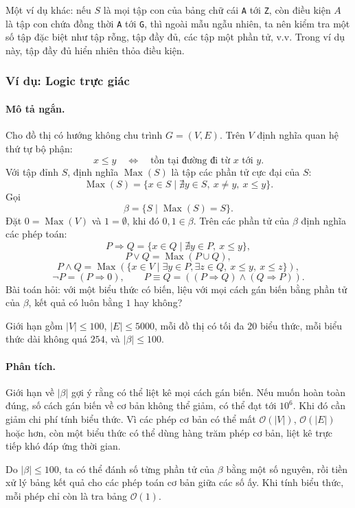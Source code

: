 \documentclass[11pt]{article}
\newcommand{\Oh}{\mathcal{O}}
\newcommand{\Max}{\operatorname{Max}}
\begin{document}
Một ví dụ khác: nếu $S$ là mọi tập con của bảng chữ cái \texttt{A} tới
\texttt{Z}, còn điều kiện $A$ là tập con chứa đồng thời \texttt{A} tới
\texttt{G}, thì ngoài mẫu ngẫu nhiên, ta nên kiểm tra một số tập đặc biệt như
tập rỗng, tập đầy đủ, các tập một phần tử, v.v. Trong ví dụ này, tập đầy đủ
hiển nhiên thỏa điều kiện.

\subsubsection{Ví dụ: Logic trực giác}

\paragraph{Mô tả ngắn.}
Cho đồ thị có hướng không chu trình $G=(V,E)$. Trên $V$ định nghĩa quan hệ thứ
tự bộ phận:
\[
  x\le y \quad\Longleftrightarrow\quad
  \text{tồn tại đường đi từ }x\text{ tới }y.
\]
Với tập đỉnh $S$, định nghĩa $\Max(S)$ là tập các phần tử cực đại của $S$:
\[
  \Max(S)=\{x\in S\mid \nexists y\in S,\ x\ne y,\ x\le y\}.
\]
Gọi
\[
  \beta=\{S\mid \Max(S)=S\}.
\]
Đặt $0=\Max(V)$ và $1=\emptyset$, khi đó $0,1\in\beta$. Trên các phần tử của
$\beta$ định nghĩa các phép toán:
\[
  P\Rightarrow Q=\{x\in Q\mid \nexists y\in P,\ x\le y\},
\]
\[
  P\vee Q=\Max(P\cup Q),
\]
\[
  P\wedge Q=\Max(\{x\in V\mid \exists y\in P,\exists z\in Q,\ x\le y,\ x\le z\}),
\]
\[
  \neg P=(P\Rightarrow 0),\qquad
  P\equiv Q=((P\Rightarrow Q)\wedge(Q\Rightarrow P)).
\]
Bài toán hỏi: với một biểu thức có biến, liệu với mọi cách gán biến bằng phần
tử của $\beta$, kết quả có luôn bằng $1$ hay không?

Giới hạn gồm $|V|\le100$, $|E|\le5000$, mỗi đồ thị có tối đa $20$ biểu thức,
mỗi biểu thức dài không quá $254$, và $|\beta|\le100$.

\paragraph{Phân tích.}
Giới hạn về $|\beta|$ gợi ý rằng có thể liệt kê mọi cách gán biến. Nếu muốn
hoàn toàn đúng, số cách gán biến về cơ bản không thể giảm, có thể đạt tới
$10^6$. Khi đó cần giảm chi phí tính biểu thức. Vì các phép cơ bản có thể mất
$\Oh(|V|)$, $\Oh(|E|)$ hoặc hơn, còn một biểu thức có thể dùng hàng trăm phép
cơ bản, liệt kê trực tiếp khó đáp ứng thời gian.

Do $|\beta|\le100$, ta có thể đánh số từng phần tử của $\beta$ bằng một số
nguyên, rồi tiền xử lý bảng kết quả cho các phép toán cơ bản giữa các số ấy.
Khi tính biểu thức, mỗi phép chỉ còn là tra bảng $\Oh(1)$.
\end{document}
